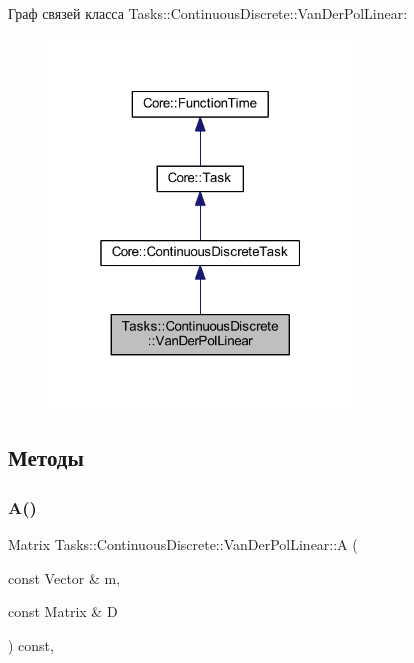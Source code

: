 Граф связей класса Tasks\+:\+:Continuous\+Discrete\+:\+:Van\+Der\+Pol\+Linear\+:\nopagebreak
\begin{figure}[H]
\begin{center}
\leavevmode
\includegraphics[width=229pt]{class_tasks_1_1_continuous_discrete_1_1_van_der_pol_linear__coll__graph}
\end{center}
\end{figure}


\subsection{Методы}
\hypertarget{class_tasks_1_1_continuous_discrete_1_1_van_der_pol_linear_abc0ead5ddd90702a5bbb93b07c74df85}{}\label{class_tasks_1_1_continuous_discrete_1_1_van_der_pol_linear_abc0ead5ddd90702a5bbb93b07c74df85} 
\subsubsection{\texorpdfstring{A()}{A()}}
{\footnotesize\ttfamily Matrix Tasks\+::\+Continuous\+Discrete\+::\+Van\+Der\+Pol\+Linear\+::A (\begin{DoxyParamCaption}\item[{const Vector \&}]{m,  }\item[{const Matrix \&}]{D }\end{DoxyParamCaption}) const\hspace{0.3cm}{\ttfamily [override]}, {\ttfamily [virtual]}}



